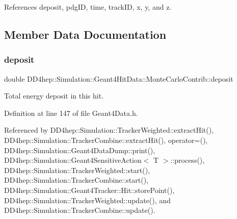 References deposit, pdg\+ID, time, track\+ID, x, y, and z.



\subsection{Member Data Documentation}
\hypertarget{class_d_d4hep_1_1_simulation_1_1_geant4_hit_data_1_1_monte_carlo_contrib_a34177a48fce1f52d1b58d6ab47e1cacc}{}\label{class_d_d4hep_1_1_simulation_1_1_geant4_hit_data_1_1_monte_carlo_contrib_a34177a48fce1f52d1b58d6ab47e1cacc} 
\subsubsection{\texorpdfstring{deposit}{deposit}}
{\footnotesize\ttfamily double D\+D4hep\+::\+Simulation\+::\+Geant4\+Hit\+Data\+::\+Monte\+Carlo\+Contrib\+::deposit}



Total energy deposit in this hit. 



Definition at line 147 of file Geant4\+Data.\+h.



Referenced by D\+D4hep\+::\+Simulation\+::\+Tracker\+Weighted\+::extract\+Hit(), D\+D4hep\+::\+Simulation\+::\+Tracker\+Combine\+::extract\+Hit(), operator=(), D\+D4hep\+::\+Simulation\+::\+Geant4\+Data\+Dump\+::print(), D\+D4hep\+::\+Simulation\+::\+Geant4\+Sensitive\+Action$<$ T $>$\+::process(), D\+D4hep\+::\+Simulation\+::\+Tracker\+Weighted\+::start(), D\+D4hep\+::\+Simulation\+::\+Tracker\+Combine\+::start(), D\+D4hep\+::\+Simulation\+::\+Geant4\+Tracker\+::\+Hit\+::store\+Point(), D\+D4hep\+::\+Simulation\+::\+Tracker\+Weighted\+::update(), and D\+D4hep\+::\+Simulation\+::\+Tracker\+Combine\+::update().

\hypertarget{class_d_d4hep_1_1_simulation_1_1_geant4_hit_data_1_1_monte_carlo_contrib_a7b755dfa6639f3cc02cd4696719d0580}{}\label{class_d_d4hep_1_1_simulation_1_1_geant4_hit_data_1_1_monte_carlo_contrib_a7b755dfa6639f3cc02cd4696719d0580} 
